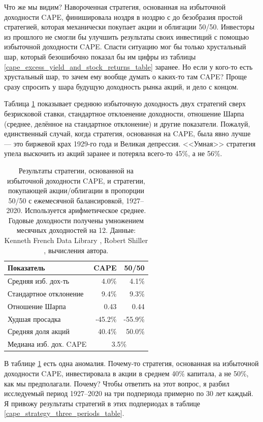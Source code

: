 Что же мы видим? Навороченная стратегия, основанная на избыточной доходности CAPE, финишировала ноздря в ноздрю с до безобразия простой стратегией, которая механически покупает акции и облигации 50/50. Инвесторы из прошлого не смогли бы улучшить результаты своих инвестиций с помощью избыточной доходности CAPE. Спасти ситуацию мог бы только хрустальный шар, который безошибочно показал бы им цифры из таблицы \ref{cape_excess_yield_and_stock_returns_table} заранее. Но если у кого-то есть хрустальный шар, то зачем ему вообще думать о каких-то там CAPE? Проще сразу спросить у шара будущую доходность рынка акций, и дело с концом.

Таблица \ref{cape_strategy_1927_table} показывает среднюю избыточную доходность двух стратегий сверх безрисковой ставки, стандартное отклоенение доходности, отношение Шарпа (среднее, делённое на стандартное отклонение) и другие показатели. Пожалуй, единственный случай, когда стратегия, основанная на CAPE, была явно лучше --- это биржевой крах 1929-го года и Великая депрессия. <<Умная>> стратегия упела выскочить из акций заранее и потеряла всего-то 45\%, а не 56\%.

\begin{table}[h!]
\centering
\begin{tabular}{l|r|r}
Показатель         & CAPE  & 50/50 \\ \hline
Средняя изб. дох-ть & 4.0\% & 4.1\% \\
Стандартное отклонение  & 9.4\% & 9.3\% \\
Отношение Шарпа    &  0.43 & 0.44  \\
Худшая просадка    & -45.2\% & -55.9\% \\
Средняя доля акций & 40.4\%  & 50.0\% \\
\cline{2-3}
Медиана изб. дох. CAPE & \multicolumn{2}{c}{3.5\%}
\end{tabular}
\caption{Результаты стратегии, основанной на избыточной доходности CAPE, и стратегии, покупающей акции/облигации в пропорции 50/50 с ежемесячной балансировкой, 1927--2020. Используется арифметическое среднее. Годовые доходности получены умножением месячных доходностей на 12. Данные: Kenneth French Data Library \cite{kennethFrench}, Robert Shiller \cite{shillerOnline}, вычисления автора.}
\label{cape_strategy_1927_table}
\end{table}

В таблице \ref{cape_strategy_1927_table} есть одна аномалия. Почему-то стратегия, основанная на избыточной доходности CAPE, инвестировала в акции в среднем 40\% капитала, а не 50\%, как мы предполагали. Почему? Чтобы ответить на этот вопрос, я разбил исследуемый период 1927--2020 на три подпериода примерно по 30 лет каждый. Я привожу результаты стратегий в этих подпериодах в таблице \ref{cape_strategy_three_periods_table}.

